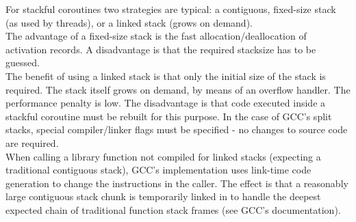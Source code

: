 For stackful coroutines two strategies are typical: a contiguous, fixed-size
stack (as used by threads), or a linked stack (grows on demand).\\
The advantage of a fixed-size stack is the fast allocation/deallocation of 
activation records. A disadvantage is that the required stacksize has to
be guessed.\\
The benefit of using a linked stack is that only the initial size of the stack
is required. The stack itself grows on demand, by means of an overflow handler.
The performance penalty is low. The disadvantage is that
code executed inside a stackful coroutine must be rebuilt for this
purpose. In the case of GCC's split stacks, special compiler/linker flags must
be specified - no changes to source code are required.\\
When calling a library function not compiled for linked stacks (expecting a
traditional contiguous stack), GCC's implementation uses link-time code
generation to change the instructions in the caller. The effect is that a
reasonably large contiguous stack chunk is temporarily linked in to handle the
deepest expected chain of traditional function stack frames (see GCC's
documentation\cite{gccsplit}).
